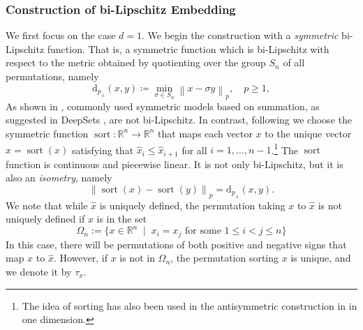 \documentclass{amsart}
\theoremstyle{plain}
\theoremstyle{definition}
\theoremstyle{remark}
\DeclareMathOperator{\sort}{sort}
\newcommand{\RR}{\mathbb{R}}
\newcommand{\normp}[2]{\left\|#1\right\|_{#2}}
\newcommand{\dsp}[1]{\mathrm{d}_{#1_{\pm}}}
\begin{document}
\subsubsection{Construction of bi-Lipschitz Embedding} \label{sssec:bl1}
We first focus on the case $d=1$. We begin the construction with a \emph{symmetric} bi-Lipschitz function. That is, a symmetric function which is bi-Lipschitz with respect to the metric obtained by quotienting over the group $S_n$ of all permutations, namely
\begin{equation} \label{eq:ds} \dsp{p}(x,y) \coloneq \min_{\sigma\in S_n}{\normp{x-\sigma y}{p}}, \quad p \geq 1,
\end{equation}
As shown in \cite{amir}, commonly used symmetric models based on summation, as suggested in DeepSets \cite{zaheer2017deep}, are not bi-Lipschitz. In contrast, following \cite{balan2022,davidson2024h} we choose the symmetric function $\sort:\RR^n \to \RR^n $ that maps each vector $x$ to the unique vector $\hat{x}=\sort(x) $ satisfying that $\hat x_i \leq \hat x_{i+1} $ for all $i=1,\ldots,n-1$.\footnote{The idea of sorting has also been used in the antisymmetric construction in \cite{hutter2020representing} in one dimension.} The $\sort$ function is continuous and piecewise linear. It is not only bi-Lipschitz, but it is also an \emph{isometry}, namely 
\begin{equation}
    \normp{\sort{(x)}-\sort{(y)}}{p}= \dsp{p}(x,y). 
\end{equation}
We note that while $\hat{x}$ is uniquely defined, the permutation taking $x$ to $\hat x$ is not uniquely defined if $x$ is in the set 
\begin{equation} \label{def:omega}
    \Omega_n :=\bigl\{x\in \RR^{n} \;\mid \; x_i=x_j \text{ for some } 1\leq i<j\leq n\bigr\}
\end{equation}
In this case, there will be permutations of both positive and negative signs that map $x$ to $\hat{x}$. However, if $x$ is not in $\Omega_n$, the permutation sorting $x$ is unique, and we denote it by $\tau_x$. 
\end{document}

